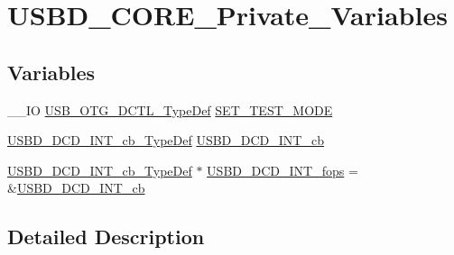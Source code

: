 \hypertarget{group___u_s_b_d___c_o_r_e___private___variables}{\section{U\-S\-B\-D\-\_\-\-C\-O\-R\-E\-\_\-\-Private\-\_\-\-Variables}
\label{group___u_s_b_d___c_o_r_e___private___variables}
}
\subsection*{Variables}
\begin{DoxyCompactItemize}
\item 
\-\_\-\-\_\-\-I\-O \hyperlink{group______otg___core__registers_ga6aab28e2f9b33185c7de34376313c69c}{U\-S\-B\-\_\-\-O\-T\-G\-\_\-\-D\-C\-T\-L\-\_\-\-Type\-Def} \hyperlink{group___u_s_b_d___c_o_r_e___private___variables_ga77158fc4ea7f97962188de180f2d3b71}{S\-E\-T\-\_\-\-T\-E\-S\-T\-\_\-\-M\-O\-D\-E}
\item 
\hyperlink{group___u_s_b___d_c_d___i_n_t___exported___defines_ga971addf3787c238bd9c4edc038f5e26a}{U\-S\-B\-D\-\_\-\-D\-C\-D\-\_\-\-I\-N\-T\-\_\-cb\-\_\-\-Type\-Def} \hyperlink{group___u_s_b_d___c_o_r_e___private___variables_gad270c4d127e05c1e09adfd4030a8c678}{U\-S\-B\-D\-\_\-\-D\-C\-D\-\_\-\-I\-N\-T\-\_\-cb}
\item 
\hyperlink{group___u_s_b___d_c_d___i_n_t___exported___defines_ga971addf3787c238bd9c4edc038f5e26a}{U\-S\-B\-D\-\_\-\-D\-C\-D\-\_\-\-I\-N\-T\-\_\-cb\-\_\-\-Type\-Def} $\ast$ \hyperlink{group___u_s_b_d___c_o_r_e___private___variables_ga130d6cc1f53470f46f6c322169ef6b7d}{U\-S\-B\-D\-\_\-\-D\-C\-D\-\_\-\-I\-N\-T\-\_\-fops} = \&\hyperlink{group___u_s_b_d___c_o_r_e___private___variables_gad270c4d127e05c1e09adfd4030a8c678}{U\-S\-B\-D\-\_\-\-D\-C\-D\-\_\-\-I\-N\-T\-\_\-cb}
\end{DoxyCompactItemize}


\subsection{Detailed Description}


